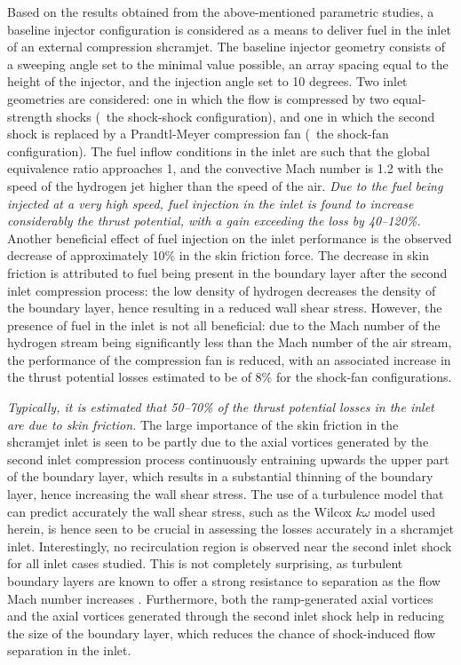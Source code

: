 Based on the results obtained from the above-mentioned parametric studies, a baseline
injector configuration is considered as a means to deliver fuel in the inlet
of an external compression shcramjet.
The baseline injector geometry consists of a sweeping angle set to the minimal
value possible, an array spacing equal to the height of the injector, and the
injection angle set to 10 degrees. Two inlet geometries are considered: one in which
the flow is compressed by two equal-strength shocks (\ie\ the shock-shock
configuration), and one in which the second shock is replaced by a Prandtl-Meyer
compression fan (\ie\ the shock-fan configuration). The fuel inflow conditions in
the inlet are such that the
global equivalence ratio approaches 1, and the convective Mach number is 1.2
with the speed of the hydrogen jet higher than the speed of the air.
\emph{Due to the fuel being injected at a very high speed, fuel injection in the inlet
is found to increase considerably the thrust potential, with a
gain exceeding the loss by 40--120\%.}
Another beneficial effect of fuel injection on the inlet performance
is the observed decrease of approximately 10\% in the skin friction force. The decrease
in skin friction is attributed to fuel being present in the boundary
layer after the second inlet compression process: the low density of
hydrogen decreases the density of the boundary layer, hence resulting
in a reduced wall shear stress. However, the presence of fuel in the inlet is not
all beneficial: due to the
Mach number of the hydrogen stream being significantly less than
the Mach number of the air stream, the performance of
the compression fan is reduced, with an associated increase in the
thrust potential losses estimated to be of 8\% for the shock-fan configurations.

\emph{Typically, it is estimated that 50--70\% of the thrust potential
losses in the inlet are due to skin friction.} The large importance of the skin friction
in the shcramjet inlet is seen to be partly due to the axial vortices generated
by the second inlet compression process continuously entraining upwards
the upper part of the boundary layer, which results in a substantial
thinning of the boundary layer, hence increasing the wall shear stress.
The use of a turbulence model that can predict accurately the wall
shear stress, such as the Wilcox $k\omega$ model used herein,
is hence seen to be crucial in assessing the losses accurately in a shcramjet
inlet. Interestingly, no recirculation region is observed near the
second inlet shock for all inlet cases studied. This is not completely
surprising, as turbulent boundary layers are known to offer a
strong resistance to separation as the flow Mach number increases \cite{jfm:1972:coleman}.
Furthermore, both the ramp-generated axial vortices and the axial vortices
generated through the second inlet shock help in reducing the size of the
boundary layer, which reduces the chance of shock-induced flow separation
in the inlet.


